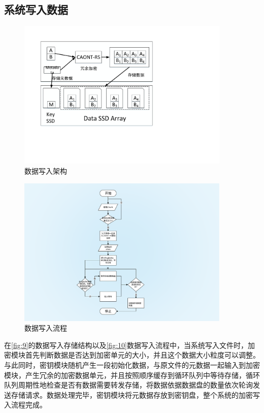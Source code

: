 \subsection{系统写入数据}
\begin{figure}[H]
	\centering
	\includegraphics[width=4in]{Pics/data-write-st.pdf}
	\caption{数据写入架构}\label{fig:9}
\end{figure}
\begin{figure}[H]
	\centering
	\includegraphics[width=4in]{Pics/data-write-pr.pdf}
	\caption{数据写入流程}\label{fig:10}
\end{figure}
在\autoref{fig:9}的数据写入存储结构以及\autoref{fig:10}数据写入流程中，当系统写入文件时，加密模块首先判断数据是否达到加密单元的大小，并且这个数据大小粒度可以调整。与此同时，密钥模块随机产生一段初始化数据，与原文件的元数据一起输入到加密模块，产生冗余的加密数据单元，并且按照顺序缓存到循环队列中等待存储，循环队列周期性地检查是否有数据需要转发存储，将数据依据数据盘的数量依次轮询发送存储请求。数据处理完毕，密钥模块将元数据存放到密钥盘，整个系统的加密写入流程完成。
